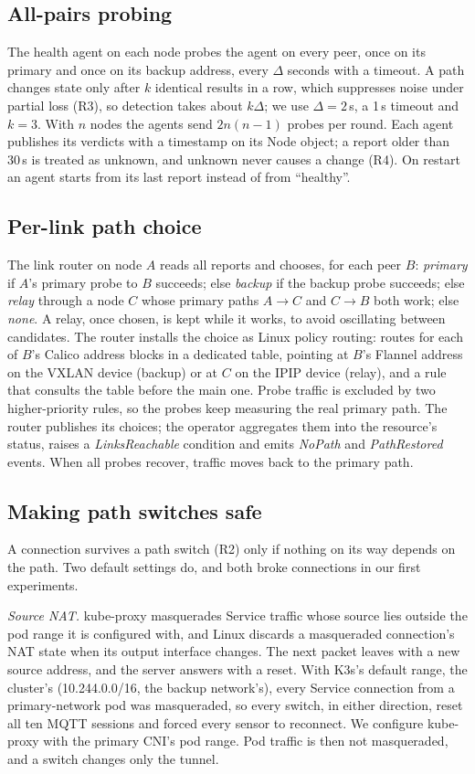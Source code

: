 \documentclass[conference,compsoc]{IEEEtran}
\begin{document}
\subsection{All-pairs probing}
The health agent on each node probes the agent on every peer, once on its primary and
once on its backup address, every $\Delta$ seconds with a timeout. A path changes state
only after $k$ identical results in a row, which suppresses noise under partial loss
(R3), so detection takes about $k\Delta$; we use $\Delta=2$\,s, a 1\,s timeout and
$k=3$. With $n$ nodes the agents send $2n(n-1)$ probes per round. Each agent publishes
its verdicts with a timestamp on its Node object; a report older than 30\,s is treated
as unknown, and unknown never causes a change (R4). On restart an agent starts from its
last report instead of from ``healthy''.

\subsection{Per-link path choice}
The link router on node $A$ reads all reports and chooses, for each peer $B$:
\emph{primary} if $A$'s primary probe to $B$ succeeds; else \emph{backup} if the backup
probe succeeds; else \emph{relay} through a node $C$ whose primary paths $A\to C$ and
$C\to B$ both work; else \emph{none}. A relay, once chosen, is kept while it works,
to avoid oscillating between candidates. The router installs the choice as Linux policy
routing: routes for each of $B$'s Calico address blocks in a dedicated table, pointing
at $B$'s Flannel address on the VXLAN device (backup) or at $C$ on the IPIP device
(relay), and a rule that consults the table before the main one. Probe traffic is
excluded by two higher-priority rules, so the probes keep measuring the real primary
path. The router publishes its choices; the operator aggregates them into the
resource's status, raises a \emph{LinksReachable} condition and emits \emph{NoPath}
and \emph{PathRestored} events. When all probes recover, traffic moves back to the
primary path.

\subsection{Making path switches safe}
\label{sec:safe}
A connection survives a path switch (R2) only if nothing on its way depends on the
path. Two default settings do, and both broke connections in our first experiments.

\emph{Source NAT.} kube-proxy masquerades Service traffic whose source lies outside the
pod range it is configured with, and Linux discards a masqueraded connection's NAT
state when its output interface changes. The next packet leaves with a new source
address, and the server answers with a reset. With K3s's default range, the cluster's
(10.244.0.0/16, the backup network's), every Service connection from a primary-network
pod was masqueraded, so every switch, in either direction, reset all ten MQTT sessions
and forced every sensor to reconnect. We configure kube-proxy with the primary
CNI's pod range. Pod traffic is then not masqueraded, and a switch changes only the
tunnel.
\end{document}
